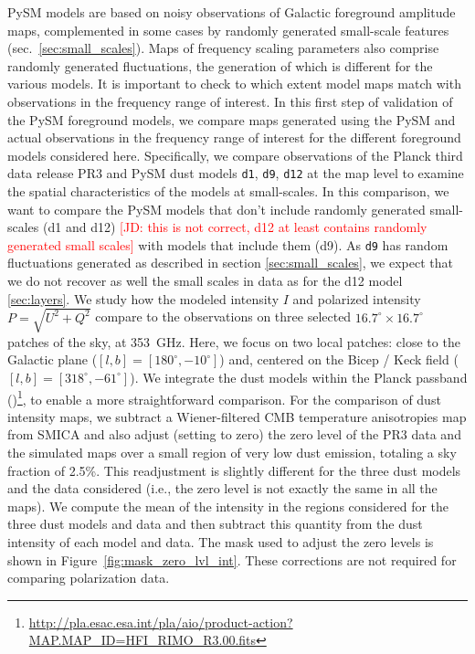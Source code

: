 \documentclass[twocolumn]{aastex631}
\begin{document}
PySM models are based on noisy observations of Galactic foreground amplitude maps, complemented in some cases by randomly generated small-scale features (sec.~\ref{sec:small_scales}). Maps of frequency scaling parameters also comprise randomly generated fluctuations, the generation of which is different for the various models. It is important to check to which extent model maps match with observations in the frequency range of interest. In this first step of validation of the PySM foreground models, we compare maps generated using the PySM and actual observations in the frequency range of interest for the different foreground models considered here. %
Specifically, we compare observations of the Planck third data release PR3 \cite{planck2016-l03} and PySM dust models \texttt{d1}, {\tt d9}, {\tt d12} at the map level to examine the spatial characteristics of the models at small-scales. In this comparison, we want to compare the PySM models that don't include randomly generated small-scales (d1 and d12) \textcolor{red}{[JD: this is not correct, d12 at least contains randomly generated small scales]} with models that include them (d9). As \texttt{d9} has random fluctuations generated as described in section \ref{sec:small_scales}, we expect that we do not recover as well the small scales in data as for the d12 model \ref{sec:layers}. %
We study how the modeled intensity $I$ and polarized intensity $P = \sqrt{U^2 + Q^2}$ compare to the observations on three selected $16.7^\circ \times 16.7^\circ$ patches of the sky, at 353~GHz. Here, we focus on two local patches: close to the Galactic plane ($[l,b] =[180^\circ,-10^\circ]$) and, centered on the Bicep / Keck field ($[l,b] =[318^\circ,-61^\circ]$).
We integrate the dust models within the Planck passband (\cite{planck2013-p03d})\footnote{\url{http://pla.esac.esa.int/pla/aio/product-action?MAP.MAP_ID=HFI_RIMO_R3.00.fits}}, to enable a more straightforward comparison. For the comparison of dust intensity maps, we subtract a Wiener-filtered CMB temperature anisotropies map from SMICA and also adjust (setting to zero) the zero level of the PR3 data and the simulated maps over a small region of very low dust emission, totaling a sky fraction of 2.5\%.
This readjustment is slightly different for the three dust models and the data considered (i.e., the zero level is not exactly the same in all the maps). We compute the mean of the intensity in the regions considered for the three dust models and data and then subtract this quantity from the dust intensity of each model and data. The mask used to adjust the zero levels is shown in Figure~\ref{fig:mask_zero_lvl_int}. 
These corrections are not required for comparing polarization data. 
\end{document}
